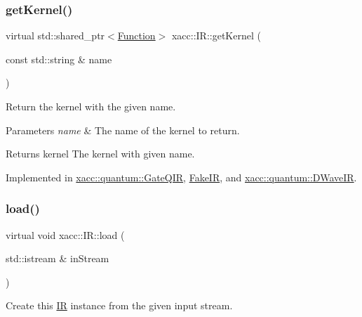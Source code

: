 \mbox{\label{a02480_a6f49b4ba4b3a15142b04873284885f0d}} 
\subsubsection{\texorpdfstring{get\+Kernel()}{getKernel()}}
{\footnotesize\ttfamily virtual std\+::shared\+\_\+ptr$<$\hyperlink{a02456}{Function}$>$ xacc\+::\+I\+R\+::get\+Kernel (\begin{DoxyParamCaption}\item[{const std\+::string \&}]{name }\end{DoxyParamCaption})\hspace{0.3cm}{\ttfamily [pure virtual]}}

Return the kernel with the given name.


\begin{DoxyParams}{Parameters}
{\em name} & The name of the kernel to return. \\
\hline
\end{DoxyParams}
\begin{DoxyReturn}{Returns}
kernel The kernel with given name. 
\end{DoxyReturn}


Implemented in \hyperlink{a01296_a194758b6edcc3ae0c7fe8004f9bfe690}{xacc\+::quantum\+::\+Gate\+Q\+IR}, \hyperlink{a02492_a351b9a1f9fb748612f5a39007c421efc}{Fake\+IR}, and \hyperlink{a01268_ac4295dfef98c94d7154a4fd39a6e5d1c}{xacc\+::quantum\+::\+D\+Wave\+IR}.

\mbox{\label{a02480_a444c2e4dc0faac500fb70fa93997e9bc}} 
\subsubsection{\texorpdfstring{load()}{load()}}
{\footnotesize\ttfamily virtual void xacc\+::\+I\+R\+::load (\begin{DoxyParamCaption}\item[{std\+::istream \&}]{in\+Stream }\end{DoxyParamCaption})\hspace{0.3cm}{\ttfamily [pure virtual]}}

Create this \hyperlink{a02480}{IR} instance from the given input stream.


